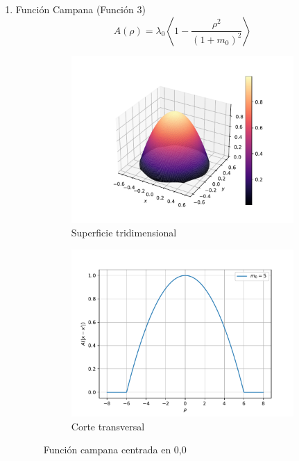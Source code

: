 \begin{enumerate}
	\item Función Campana (Función 3)
	\begin{equation}
		A(\rho)=\lambda_0\left<1-\frac{\rho^2}{(1+m_0)^2}\right>
	\end{equation}
	\begin{figure}
	    \centering
	    \sffamily
	    \begin{subfigure}{0.45\textwidth}
	    \centering
	        \includegraphics[width=\textwidth]{figuras/campana3d.pdf}
	        \caption{Superficie tridimensional}
	        \label{fig:campana.3d}
	    \end{subfigure}
	    \begin{subfigure}{0.45\textwidth}
	    \centering
	        \includegraphics[width=\textwidth]{figuras/campana2d.pdf}
	        \caption{Corte transversal}
	        \label{fig:campana.2d}
	    \end{subfigure}
	    \caption{Función campana centrada en 0,0}
	    \label{fig:campana}
	\end{figure}
\end{enumerate}

